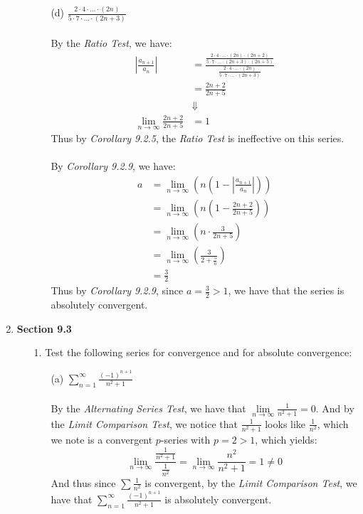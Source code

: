 \documentclass[12pt,letterpaper]{article}
\newcommand{\limx}[2]{\displaystyle\lim\limits_{#1 \to #2}}
\newcommand{\abs}[1]{\left\lvert #1 \right\rvert}
\theoremstyle{case}
\theoremstyle{definition}
\begin{document}
\begin{enumerate}
\begin{enumerate}
\begin{enumerate}
				\item[(d)] $\displaystyle\frac{2\cdot4\cdot\dots\cdot(2n)}{5\cdot7\cdot\dots\cdot(2n+3)}$
				\\\\By the \textit{Ratio Test}, we have:
				\begin{align*}
					\abs{\frac{a_{n+1}}{a_n}} &= \frac{\displaystyle\frac{2 \cdot 4 \cdot \dots \cdot (2n)\cdot (2n+2)}{5 \cdot 7 \cdot \dots \cdot (2n+3) \cdot (2n+5)}}{\displaystyle\frac{2 \cdot 4 \cdot \dots \cdot (2n)}{5 \cdot 7 \cdot \dots \cdot (2n+3)}} \\
					&= \frac{2n+2}{2n+5} \\
					&\Downarrow \\
					\limx{n}{\infty} \frac{2n+2}{2n+5} &= 1
				\end{align*}
				Thus by \textit{Corollary 9.2.5}, the \textit{Ratio Test} is ineffective on this series.
				\\\\By \textit{Corollary 9.2.9}, we have:
				\begin{align*}
					a &= \limx{n}{\infty} \left(n \left(1-\abs{\frac{a_{n+1}}{a_n}}\right)\right) \\
					&= \limx{n}{\infty} \left(n \left(1-\frac{2n+2}{2n+5}\right)\right) \\
					&= \limx{n}{\infty} \left(n \cdot \frac{3}{2n+5}\right) \\
					&= \limx{n}{\infty} \left(\frac{3}{2+\frac{5}{n}}\right) \\
					&= \frac{3}{2}
				\end{align*}
				Thus by \textit{Corollary 9.2.9}, since $a=\frac{3}{2} > 1$, we have that the series is absolutely convergent.
			\end{enumerate}
		\end{enumerate}
	
		\item \textbf{Section 9.3}
		\begin{enumerate}
			\item[1.] Test the following series for convergence and for absolute convergence:
			\begin{enumerate}
				\item[(a)] $\displaystyle\sum_{n=1}^{\infty} \frac{(-1)^{n+1}}{n^2+1}$
				\\\\By the \textit{Alternating Series Test}, we have that $\limx{n}{\infty} \frac{1}{n^2+1}=0$. And by the \textit{Limit Comparison Test}, we notice that $\frac{1}{n^2+1}$ looks like $\frac{1}{n^2}$, which we note is a convergent $p$-series with $p=2>1$, which yields:
				\[\limx{n}{\infty} \frac{\displaystyle\frac{1}{n^2+1}}{\displaystyle\frac{1}{n^2}}= \limx{n}{\infty} \frac{n^2}{n^2+1} = 1 \neq 0\]
				And thus since $\sum \frac{1}{n^2}$ is convergent, by the \textit{Limit Comparison Test}, we have that $\displaystyle\sum_{n=1}^{\infty} \frac{(-1)^{n+1}}{n^2+1}$ is absolutely convergent.\\
				

\end{enumerate}
\end{enumerate}
\end{enumerate}
\end{document}
